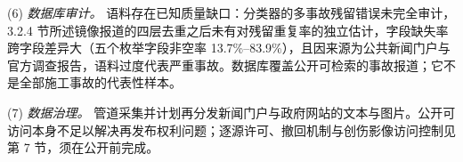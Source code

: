 \documentclass[11pt]{article}
\begin{document}
(6) \textit{{\cjkfont 数\allowbreak 据\allowbreak 库\allowbreak 审\allowbreak 计\allowbreak 。}} {\cjkfont 语\allowbreak 料\allowbreak 存\allowbreak 在\allowbreak 已\allowbreak 知\allowbreak 质\allowbreak 量\allowbreak 缺\allowbreak 口\allowbreak ：\allowbreak 分\allowbreak 类\allowbreak 器\allowbreak 的\allowbreak 多\allowbreak 事\allowbreak 故\allowbreak 残\allowbreak 留\allowbreak 错\allowbreak 误\allowbreak 未\allowbreak 完\allowbreak 全\allowbreak 审\allowbreak 计\allowbreak ，}3.2.4 {\cjkfont 节\allowbreak 所\allowbreak 述\allowbreak 镜\allowbreak 像\allowbreak 报\allowbreak 道\allowbreak 的\allowbreak 四\allowbreak 层\allowbreak 去\allowbreak 重\allowbreak 之\allowbreak 后\allowbreak 未\allowbreak 有\allowbreak 对\allowbreak 残\allowbreak 留\allowbreak 重\allowbreak 复\allowbreak 率\allowbreak 的\allowbreak 独\allowbreak 立\allowbreak 估\allowbreak 计\allowbreak ，\allowbreak 字\allowbreak 段\allowbreak 缺\allowbreak 失\allowbreak 率\allowbreak 跨\allowbreak 字\allowbreak 段\allowbreak 差\allowbreak 异\allowbreak 大\allowbreak （\allowbreak 五\allowbreak 个\allowbreak 枚\allowbreak 举\allowbreak 字\allowbreak 段\allowbreak 非\allowbreak 空\allowbreak 率} 13.7\%--83.9\%{\cjkfont ）\allowbreak ，\allowbreak 且\allowbreak 因\allowbreak 来\allowbreak 源\allowbreak 为\allowbreak 公\allowbreak 共\allowbreak 新\allowbreak 闻\allowbreak 门\allowbreak 户\allowbreak 与\allowbreak 官\allowbreak 方\allowbreak 调\allowbreak 查\allowbreak 报\allowbreak 告\allowbreak ，\allowbreak 语\allowbreak 料\allowbreak 过\allowbreak 度\allowbreak 代\allowbreak 表\allowbreak 严\allowbreak 重\allowbreak 事\allowbreak 故\allowbreak 。\allowbreak 数\allowbreak 据\allowbreak 库\allowbreak 覆\allowbreak 盖\allowbreak 公\allowbreak 开\allowbreak 可\allowbreak 检\allowbreak 索\allowbreak 的\allowbreak 事\allowbreak 故\allowbreak 报\allowbreak 道\allowbreak ；\allowbreak 它\allowbreak 不\allowbreak 是\allowbreak 全\allowbreak 部\allowbreak 施\allowbreak 工\allowbreak 事\allowbreak 故\allowbreak 的\allowbreak 代\allowbreak 表\allowbreak 性\allowbreak 样\allowbreak 本\allowbreak 。}

(7) \textit{{\cjkfont 数\allowbreak 据\allowbreak 治\allowbreak 理\allowbreak 。}} {\cjkfont 管\allowbreak 道\allowbreak 采\allowbreak 集\allowbreak 并\allowbreak 计\allowbreak 划\allowbreak 再\allowbreak 分\allowbreak 发\allowbreak 新\allowbreak 闻\allowbreak 门\allowbreak 户\allowbreak 与\allowbreak 政\allowbreak 府\allowbreak 网\allowbreak 站\allowbreak 的\allowbreak 文\allowbreak 本\allowbreak 与\allowbreak 图\allowbreak 片\allowbreak 。\allowbreak 公\allowbreak 开\allowbreak 可\allowbreak 访\allowbreak 问\allowbreak 本\allowbreak 身\allowbreak 不\allowbreak 足\allowbreak 以\allowbreak 解\allowbreak 决\allowbreak 再\allowbreak 发\allowbreak 布\allowbreak 权\allowbreak 利\allowbreak 问\allowbreak 题\allowbreak ；\allowbreak 逐\allowbreak 源\allowbreak 许\allowbreak 可\allowbreak 、\allowbreak 撤\allowbreak 回\allowbreak 机\allowbreak 制\allowbreak 与\allowbreak 创\allowbreak 伤\allowbreak 影\allowbreak 像\allowbreak 访\allowbreak 问\allowbreak 控\allowbreak 制\allowbreak 见\allowbreak 第} 7 {\cjkfont 节\allowbreak ，\allowbreak 须\allowbreak 在\allowbreak 公\allowbreak 开\allowbreak 前\allowbreak 完\allowbreak 成\allowbreak 。}
\end{document}
